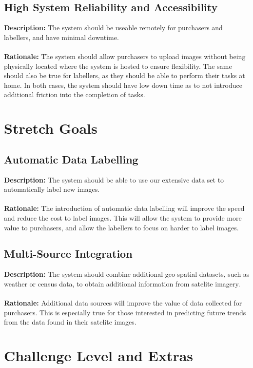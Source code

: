 \documentclass{article}
\begin{document}
\subsection{High System Reliability and Accessibility}
\textbf{Description: }The system should be useable remotely for purchasers and labellers, and have minimal downtime. \\\\
\textbf{Rationale: }The system should allow purchasers to upload images without being physically located where the system is hosted to ensure flexibility. The same should also be true for labellers, as they 
should be able to perform their tasks at home. In both cases, the system should have low down time as to not introduce additional friction into the completion of tasks.

\section{Stretch Goals}
\subsection{Automatic Data Labelling}
\textbf{Description: }The system should be able to use our extensive data set to automatically label new images. \\\\
\textbf{Rationale: }The introduction of automatic data labelling will improve the speed and reduce the cost to label images. This will allow the system to provide more value to 
purchasers, and allow the labellers to focus on harder to label images.
\subsection{Multi-Source Integration}
\textbf{Description: }The system should combine additional geo-spatial datasets, such as weather or census data, to obtain additional information from satelite imagery. \\\\
\textbf{Rationale: }Additional data sources will improve the value of data collected for purchasers. This is especially true for those interested in predicting future trends from the 
data found in their satelite images.



\section{Challenge Level and Extras}
\end{document}
